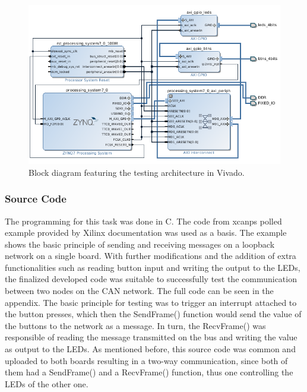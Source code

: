 \begin{figure}[h!]
	\centering
	\includegraphics[width = 1.1\linewidth]{graphics/Zybo_BasicTestingArchitecture_for_CAN.png}
	\caption{Block diagram featuring the testing architecture in Vivado.}
	\label{fig:CAN_Testing_Architecture}
\end{figure}

\subsubsection{Source Code}
The programming for this task was done in C.
The code from xcanps polled example provided by Xilinx documentation was used as a basis.
The example shows the basic principle of sending and receiving messages on a loopback network on a single board.
With further modifications and the addition of extra functionalities such as reading button input and writing the output to the LEDs, the finalized developed code was suitable to successfully test the communication between two nodes on the CAN network. The full code can be seen in the appendix.
The basic principle for testing was to trigger an interrupt attached to the button presses, which then the SendFrame() function would send the value of the buttons to the network as a message.
In turn, the RecvFrame() was responsible of reading the message transmitted on the bus and writing the value as output to the LEDs.
As mentioned before, this source code was common and uploaded to both boards resulting in a two-way communication, since both of them had a SendFrame() and a RecvFrame() function, thus one controlling the LEDs of the other one.

